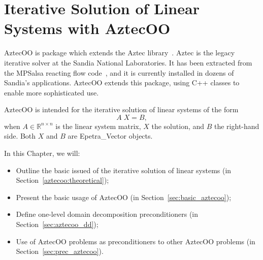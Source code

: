% 
% 
% 
%   
%   
% 
% 

\section{Iterative Solution of Linear Systems with AztecOO}
\label{chap:aztecoo}

AztecOO is package which extends the Aztec library~\cite{Aztec2.1}.
Aztec is the legacy iterative solver at the Sandia National
Laboratories.  It has been extracted from the MPSalsa reacting flow
code~\cite{MPSalsa-Theory,MPSalsa-User-Guide}, and it is currently
installed in dozens of Sandia's applications. AztecOO extends this
package, using C++ classes to enable more sophisticated use.

AztecOO is intended for the iterative solution of linear systems of the
form
\begin{equation}
  \label{eq:linear_sys}
  A \; X = B ,
\end{equation}
when $A \in \mathbb{R}^{n \times n}$ is the linear system matrix, $X$
the solution, and $B$ the right-hand side. Both $X$ and $B$ are
Epetra\_Vector objects.

In this Chapter, we  will:
\begin{itemize}
\item Outline the basic issued of the iterative solution of linear
  systems (in Section~\ref{aztecoo:theoretical});
\item Present the basic usage of AztecOO (in
  Section~\ref{sec:basic_aztecoo});
\item Define one-level domain decomposition preconditioners (in
  Section~\ref{sec:aztecoo_dd});
\item Use of AztecOO problems as preconditioners to other AztecOO
  problems (in Section~\ref{sec:prec_aztecoo}).
\end{itemize}

